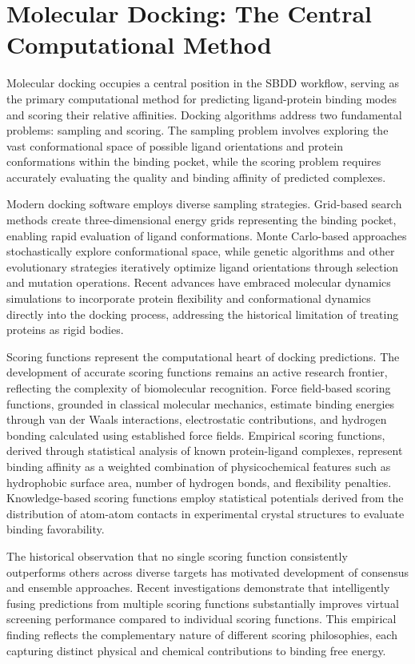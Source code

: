 \documentclass[12pt,a4paper]{article}
\begin{document}
\section*{Molecular Docking: The Central Computational Method}

Molecular docking occupies a central position in the SBDD workflow, serving as the primary computational method for predicting ligand-protein binding modes and scoring their relative affinities. Docking algorithms address two fundamental problems: sampling and scoring. The sampling problem involves exploring the vast conformational space of possible ligand orientations and protein conformations within the binding pocket, while the scoring problem requires accurately evaluating the quality and binding affinity of predicted complexes. \citep{Lipton2012,Morris2009}

Modern docking software employs diverse sampling strategies. Grid-based search methods create three-dimensional energy grids representing the binding pocket, enabling rapid evaluation of ligand conformations. Monte Carlo-based approaches stochastically explore conformational space, while genetic algorithms and other evolutionary strategies iteratively optimize ligand orientations through selection and mutation operations. Recent advances have embraced molecular dynamics simulations to incorporate protein flexibility and conformational dynamics directly into the docking process, addressing the historical limitation of treating proteins as rigid bodies.

Scoring functions represent the computational heart of docking predictions. The development of accurate scoring functions remains an active research frontier, reflecting the complexity of biomolecular recognition. Force field-based scoring functions, grounded in classical molecular mechanics, estimate binding energies through van der Waals interactions, electrostatic contributions, and hydrogen bonding calculated using established force fields. Empirical scoring functions, derived through statistical analysis of known protein-ligand complexes, represent binding affinity as a weighted combination of physicochemical features such as hydrophobic surface area, number of hydrogen bonds, and flexibility penalties. Knowledge-based scoring functions employ statistical potentials derived from the distribution of atom-atom contacts in experimental crystal structures to evaluate binding favorability.

The historical observation that no single scoring function consistently outperforms others across diverse targets has motivated development of consensus and ensemble approaches. Recent investigations demonstrate that intelligently fusing predictions from multiple scoring functions substantially improves virtual screening performance compared to individual scoring functions. This empirical finding reflects the complementary nature of different scoring philosophies, each capturing distinct physical and chemical contributions to binding free energy.
\end{document}
